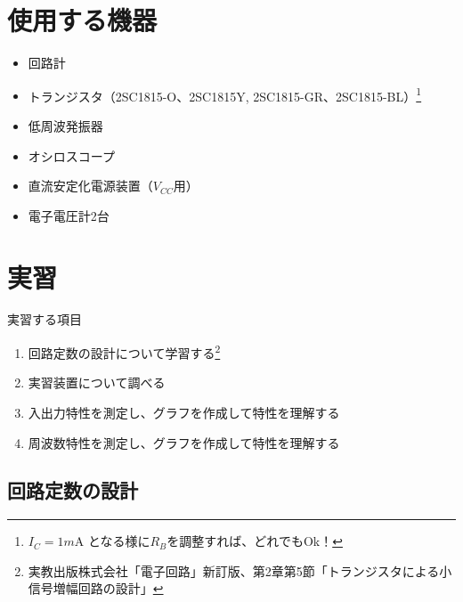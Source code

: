 \documentclass[uplatex,a4paper,11pt,oneside,openany]{jsbook}
\begin{document}
\section{使用する機器}

\begin{itemize}
\item 回路計
\item トランジスタ（2SC1815-O、2SC1815Y, 2SC1815-GR、2SC1815-BL）\footnote{$I_C=1m$A となる様に$R_B$を調整すれば、どれでもOk！}
\item 低周波発振器
\item オシロスコープ
\item 直流安定化電源装置（$V_{CC}$用）
\item 電子電圧計2台
\end{itemize}

\section{実習}

実習する項目
\begin{enumerate}
\item[(1)] 回路定数の設計について学習する\footnote{実教出版株式会社「電子回路」新訂版、第2章第5節「トランジスタによる小信号増幅回路の設計」}
\item[(2)] 実習装置について調べる
\item[(3)] 入出力特性を測定し、グラフを作成して特性を理解する
\item[(4)] 周波数特性を測定し、グラフを作成して特性を理解する
\end{enumerate}

\newpage

\subsection{回路定数の設計}
\end{document}
